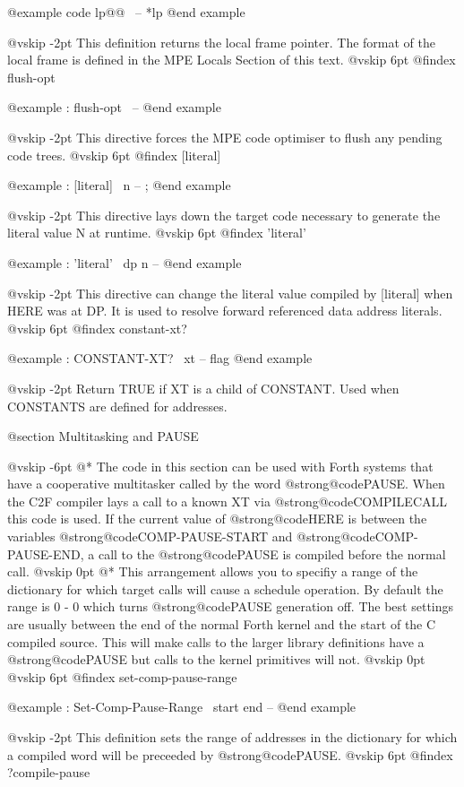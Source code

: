 @example
code lp@@        \ -- *lp @end example

@vskip -2pt
This definition returns the local frame pointer. The format of the
local frame is defined in the MPE Locals Section of this text.
@vskip 6pt
@findex flush-opt

@example
: flush-opt     \ -- @end example

@vskip -2pt
This directive forces the MPE code optimiser to flush any pending
code trees.
@vskip 6pt
@findex [literal]

@example
: [literal]     \ n -- ; @end example

@vskip -2pt
This directive lays down the target code necessary to generate the
literal value N at runtime.
@vskip 6pt
@findex 'literal'

@example
: 'literal'     \ dp n -- @end example

@vskip -2pt
This directive can change the literal value compiled by [literal]
when HERE was at DP. It is used to resolve forward referenced
data address literals.
@vskip 6pt
@findex constant-xt?

@example
: CONSTANT-XT?          \ xt -- flag @end example

@vskip -2pt
Return TRUE if XT is a child of CONSTANT. Used when CONSTANTS are
defined for addresses.

@section Multitasking and PAUSE


@vskip -6pt
@*
The code in this section can be used with Forth systems that
have a cooperative multitasker called by the word @strong{@code{PAUSE}}.
When the C2F compiler lays a call to a known XT via
@strong{@code{COMPILECALL}} this code is used. If the current value of
@strong{@code{HERE}} is between the variables @strong{@code{COMP-PAUSE-START}}
and @strong{@code{COMP-PAUSE-END}}, a call to the @strong{@code{PAUSE}} is
compiled before the normal call.
@vskip 0pt
@*
This arrangement allows you to specifiy a range of the
dictionary for which target calls will cause a schedule
operation. By default the range is 0 - 0 which turns @strong{@code{PAUSE}}
generation off. The best settings are usually between the end
of the normal Forth kernel and the start of the C compiled
source. This will make calls to the larger library definitions
have a @strong{@code{PAUSE}} but calls to the kernel primitives will not.
@vskip 0pt
@vskip 6pt
@findex set-comp-pause-range

@example
: Set-Comp-Pause-Range  \ start end -- @end example

@vskip -2pt
This definition sets the range of addresses in the dictionary
for which a compiled word will be preceeded by @strong{@code{PAUSE}}.
@vskip 6pt
@findex ?compile-pause


